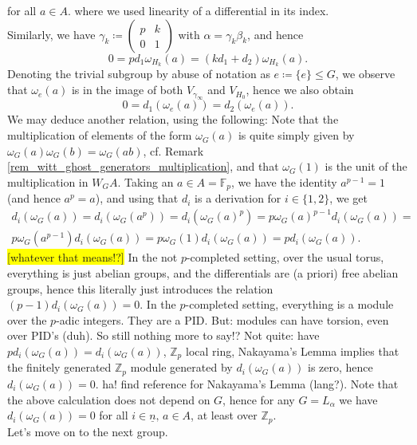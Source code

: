 \documentclass[10pt, a4paper, UKenglish]{article}
\numberwithin{equation}{section}
\newcommand{\bF}{\mathbb{F}}
\newcommand{\bZ}{\mathbb{Z}}
\newcommand{\defas}{\coloneqq}  %
\newcommand{\ind}[1]{\underline{#1}}
\newcommand{\comm}[1]{\colorbox{yellow}{#1}}
\newcommand{\inmatrixtwo}[4]{\left( \begin{smallmatrix} #1 & #2 \\ #3 & #4 \end{smallmatrix} \right)}
\theoremstyle{plain}
\theoremstyle{definition}
\begin{document}
for all $a \in A$. where we used linearity of a differential in its index.\\
Similarly, we have $\gamma_k \defas \inmatrixtwo{p}{k}{0}{1}$ with $\alpha = \gamma_k \beta_k$, and hence
\begin{equation}\label{eq_group_diag(p,p)_subgroup_(p,k_0,1)}
	0 = p d_1  \omega_{H_k}(a) = (k d_1 + d_2) \omega_{H_k}(a).
\end{equation}
Denoting the trivial subgroup by abuse of notation as $e \defas \{e\} \leq G$, we observe that $\omega_e(a)$ is in the image of both $V_{\gamma_\infty}$ and $V_{H_0}$, hence we also obtain
\begin{equation*}
	0 = d_1(\omega_e(a)) = d_2 (\omega_e(a)).
\end{equation*}
We may deduce another relation, using the following: Note that the multiplication of elements of the form $\omega_G(a)$ is quite simply given by $\omega_G (a) \omega_G (b) = \omega_G (ab)$, cf. Remark \ref{rem_witt_ghost_generators_multiplication}, and that $\omega_G(1)$ is the unit of the multiplication in $W_G A$. Taking an $a \in A = \bF_p$, we have the identity $a^{p-1} = 1$ (and hence $a^p=a$), and using that $d_i$ is a derivation for $i \in \{1,2\}$, we get
\begin{gather*}
	d_i(\omega_G(a)) = d_i(\omega_G(a^p)) = d_i(\omega_G(a)^p) = p \omega_G(a)^{p-1} d_i(\omega_G(a)) = \\ %
	p \omega_G(a^{p-1}) d_i(\omega_G(a)) = p \omega_G(1) d_i(\omega_G(a)) = p d_i(\omega_G(a)). %
\end{gather*}
\comm{[whatever that means!?]} In the not $p$-completed setting, over the usual torus, everything is just abelian groups, and the differentials are (a priori) free abelian groups, hence this literally just introduces the relation $(p-1)d_i (\omega_G(a)) = 0$. In the $p$-completed setting, everything is a module over the $p$-adic integers. They are a PID. But: modules can have torsion, even over PID's (duh). So still nothing more to say!? Not quite: have $p d_i (\omega_G(a)) = d_i (\omega_G(a))$, $\bZ_p$ local ring, Nakayama's Lemma implies that the finitely generated $\bZ_p$ module generated by $d_i (\omega_G(a))$ is zero, hence $d_i (\omega_G(a)) = 0$. ha! find reference for Nakayama's Lemma (lang?). Note that the above calculation does not depend on $G$, hence for any $G = L_\alpha$ we have $d_i(\omega_G(a)) = 0$ for all $i\in \ind{n},\, a \in A$, at least over $\bZ_p$.\\
Let's move on to the next group.


\end{document}
